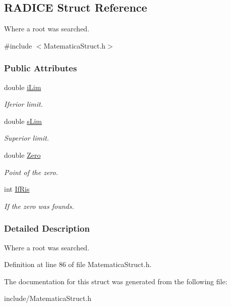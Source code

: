 \hypertarget{structRADICE}{}\subsection{R\+A\+D\+I\+CE Struct Reference}
\label{structRADICE}


Where a root was searched.  




{\ttfamily \#include $<$Matematica\+Struct.\+h$>$}

\subsubsection*{Public Attributes}
\begin{DoxyCompactItemize}
\item 
double \hyperlink{structRADICE_a2ef55b0755809fec048d5151a39f531b}{i\+Lim}\hypertarget{structRADICE_a2ef55b0755809fec048d5151a39f531b}{}\label{structRADICE_a2ef55b0755809fec048d5151a39f531b}

\begin{DoxyCompactList}\small\item\em Iferior limit. \end{DoxyCompactList}\item 
double \hyperlink{structRADICE_a8ab38022bf4ac287149faf5fbde17382}{s\+Lim}\hypertarget{structRADICE_a8ab38022bf4ac287149faf5fbde17382}{}\label{structRADICE_a8ab38022bf4ac287149faf5fbde17382}

\begin{DoxyCompactList}\small\item\em Superior limit. \end{DoxyCompactList}\item 
double \hyperlink{structRADICE_a6d82c7bcdff1f26e7560b2fb295daf3e}{Zero}\hypertarget{structRADICE_a6d82c7bcdff1f26e7560b2fb295daf3e}{}\label{structRADICE_a6d82c7bcdff1f26e7560b2fb295daf3e}

\begin{DoxyCompactList}\small\item\em Point of the zero. \end{DoxyCompactList}\item 
int \hyperlink{structRADICE_ac4670df9c457301218ddf343f06970c5}{If\+Ris}\hypertarget{structRADICE_ac4670df9c457301218ddf343f06970c5}{}\label{structRADICE_ac4670df9c457301218ddf343f06970c5}

\begin{DoxyCompactList}\small\item\em If the zero was founds. \end{DoxyCompactList}\end{DoxyCompactItemize}


\subsubsection{Detailed Description}
Where a root was searched. 

Definition at line 86 of file Matematica\+Struct.\+h.



The documentation for this struct was generated from the following file\+:\begin{DoxyCompactItemize}
\item 
include/Matematica\+Struct.\+h\end{DoxyCompactItemize}

